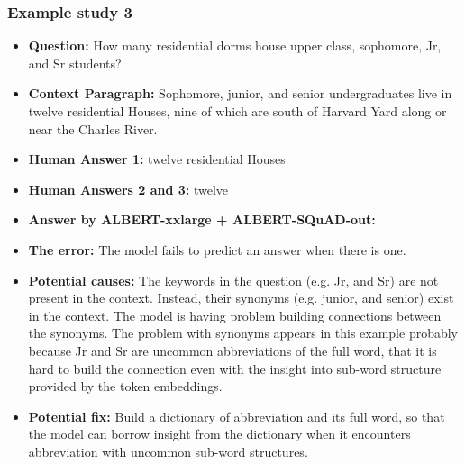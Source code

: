 \documentclass{article}
\begin{document}
\subsubsection{Example study 3}
\begin{itemize}
    \item \textbf{Question:} How many residential dorms house upper class, sophomore, Jr, and Sr students?
    \item \textbf{Context Paragraph:} Sophomore, junior, and senior undergraduates live in twelve residential Houses, nine of which are south of Harvard Yard along or near the Charles River. 
    \item \textbf{Human Answer 1:} twelve residential Houses
    \item \textbf{Human Answers 2 and 3:} twelve
    \item \textbf{Answer by ALBERT-xxlarge + ALBERT-SQuAD-out:} 
\item \textbf{The error:} The model fails to predict an answer when there is one.
    \item \textbf{Potential causes:} The keywords in the question (e.g. Jr, and Sr) are not present in the context. Instead, their synonyms (e.g. junior, and senior) exist in the context. The model is having problem building connections between the synonyms. The problem with synonyms appears in this example probably because Jr and Sr are uncommon abbreviations of the full word, that it is hard to build the connection even with the insight into sub-word structure provided by the token embeddings.
    \item \textbf{Potential fix:} Build a dictionary of abbreviation and its full word, so that the model can borrow insight from the dictionary when it encounters abbreviation with uncommon sub-word structures.
\end{itemize}
\end{document}
